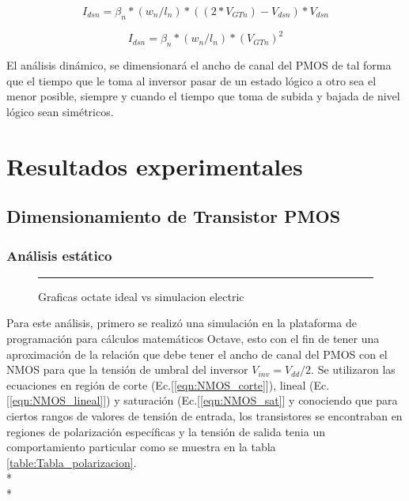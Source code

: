 \documentclass[12pt,a4paper]{article} %
\begin{document}
\begin{equation}\label{eqn:NMOS_lineal}
I_{dsn}=\beta_{n}*(w_{n}/l_{n})*((2*V_{GTn})-V_{dsn})*V_{dsn}
\end{equation}

\begin{equation}\label{eqn:NMOS_sat}
I_{dsn}=\beta_{n}*(w_{n}/l_{n})*(V_{GTn})^2
\end{equation}

El análisis dinámico, se dimensionará el ancho de canal del PMOS de tal forma que el tiempo que le toma al inversor pasar de un estado lógico a otro sea el menor posible, siempre y cuando el tiempo que toma de subida y bajada de nivel lógico sean simétricos.


\section{Resultados experimentales}


\subsection{Dimensionamiento de Transistor PMOS}

\subsubsection{Análisis estático}


\begin{figure}[htbp]
  \centering
    \rule{35em}{0.5pt}
  \caption[Captura]{Graficas octate ideal vs simulacion electric}
  \label{fig:inv_est}
\end{figure}

Para este análisis, primero se realizó una simulación en la plataforma de programación para cálculos matemáticos Octave, esto con el fin de tener una aproximación de la relación que debe tener el ancho de canal del PMOS con el NMOS para que la tensión de umbral del inversor $V_{inv}=V_{dd}/2$. Se utilizaron las ecuaciones en región de corte (Ec.[\ref{eqn:NMOS_corte}]), lineal (Ec.[\ref{eqn:NMOS_lineal}]) y saturación (Ec.[\ref{eqn:NMOS_sat}] y conociendo que para ciertos rangos de valores de tensión de entrada, los transistores se encontraban en regiones de polarización específicas y la tensión de salida tenia un comportamiento particular como se muestra en la tabla \ref{table:Tabla_polarizacion}.\\*
\\*
\end{document}
